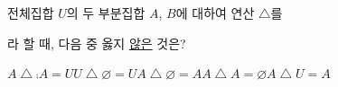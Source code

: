전체집합 $U$의 두 부분집합 $A$, $B$에 대하여 연산 $\triangle$를 \par\smallskip{}\par\smallskip\noindent 라 할 때, 다음 중 옳지 \underline{않은} 것은?
\begin{choices32}{$A\mathbin{\triangle}\comp{A}=U$}{$U\mathbin{\triangle}\varnothing=U$}{$A\mathbin{\triangle}\varnothing=A$}{$A\mathbin{\triangle}A=\varnothing$}{$A\mathbin{\triangle}U=A$}\end{choices32}
